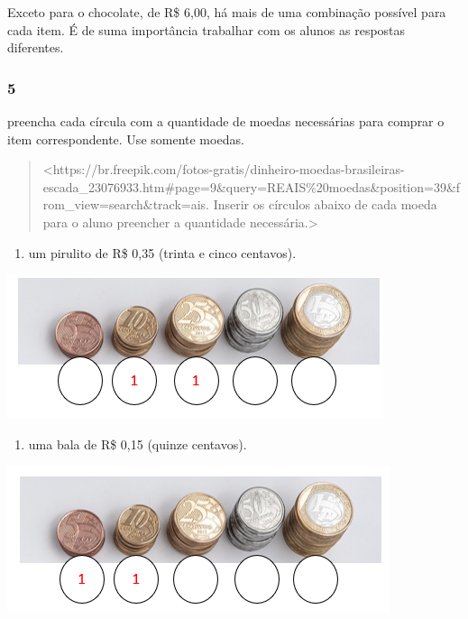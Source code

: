 Exceto para o chocolate, de R\$ 6,00, há mais de uma combinação possível para cada item. É de suma importância
trabalhar com os alunos as respostas diferentes.

\subsubsection{5}\label{section-58}

preencha cada círcula com a quantidade de moedas necessárias para comprar o item correspondente. Use somente moedas.

\begin{quote}
\textless{}https://br.freepik.com/fotos-gratis/dinheiro-moedas-brasileiras-escada\_23076933.htm\#page=9\&query=REAIS\%20moedas\&position=39\&from\_view=search\&track=ais.
Inserir os círculos abaixo de cada moeda para o aluno preencher a
quantidade necessária.\textgreater{}
\end{quote}

\begin{enumerate}
\def\labelenumi{\Alph{enumi})}
\item
  um pirulito de R\$ 0,35 (trinta e cinco centavos).
\end{enumerate}

\includegraphics[width=4.34436in,height=1.66690in]{media/image71.png}

\begin{enumerate}
\def\labelenumi{\Alph{enumi})}
\item
  uma bala de R\$ 0,15 (quinze centavos).
\end{enumerate}

\includegraphics[width=4.41728in,height=1.68774in]{media/image72.png}

